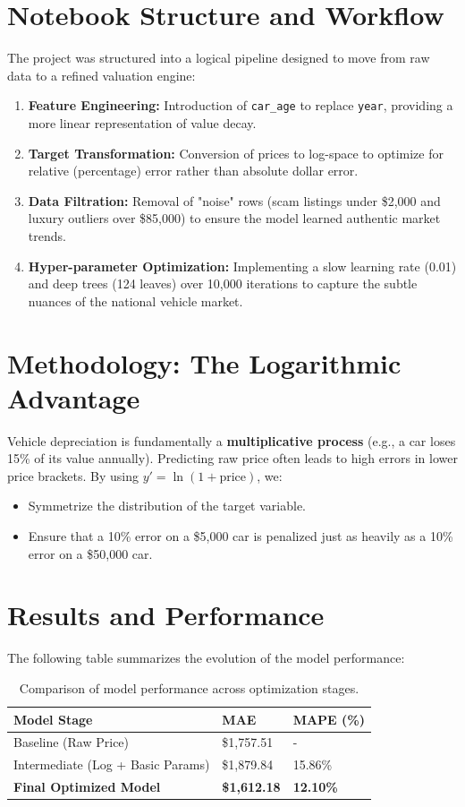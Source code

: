 \documentclass[11pt]{article}
\begin{document}
\section{Notebook Structure and Workflow}
The project was structured into a logical pipeline designed to move from raw data to a refined valuation engine:
\begin{enumerate}
    \item \textbf{Feature Engineering:} Introduction of \texttt{car\_age} to replace \texttt{year}, providing a more linear representation of value decay.
    \item \textbf{Target Transformation:} Conversion of prices to log-space to optimize for relative (percentage) error rather than absolute dollar error.
    \item \textbf{Data Filtration:} Removal of "noise" rows (scam listings under \$2,000 and luxury outliers over \$85,000) to ensure the model learned authentic market trends.
    \item \textbf{Hyper-parameter Optimization:} Implementing a slow learning rate (0.01) and deep trees (124 leaves) over 10,000 iterations to capture the subtle nuances of the national vehicle market.
\end{enumerate}

\section{Methodology: The Logarithmic Advantage}
Vehicle depreciation is fundamentally a \textbf{multiplicative process} (e.g., a car loses 15\% of its value annually). Predicting raw price often leads to high errors in lower price brackets. By using $y' = \ln(1 + \text{price})$, we:
\begin{itemize}
    \item Symmetrize the distribution of the target variable.
    \item Ensure that a 10\% error on a \$5,000 car is penalized just as heavily as a 10\% error on a \$50,000 car.
\end{itemize}



\section{Results and Performance}
The following table summarizes the evolution of the model performance:

\begin{table}[h]
\centering
\begin{tabular}{@{}lll@{}}
\toprule
\textbf{Model Stage} & \textbf{MAE} & \textbf{MAPE (\%)} \\ \midrule
Baseline (Raw Price) & \$1,757.51 & - \\
Intermediate (Log + Basic Params) & \$1,879.84 & 15.86\% \\
\textbf{Final Optimized Model} & \textbf{\$1,612.18} & \textbf{12.10\%} \\ \bottomrule
\end{tabular}
\caption{Comparison of model performance across optimization stages.}
\end{table}
\end{document}
